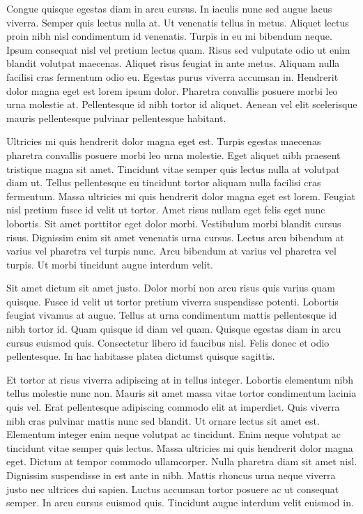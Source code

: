 \documentclass[11pt,a4paper]{article}
\begin{document}
Congue quisque egestas diam in arcu cursus. In iaculis nunc sed augue lacus viverra. Semper quis lectus nulla at. Ut venenatis tellus in metus. Aliquet lectus proin nibh nisl condimentum id venenatis. Turpis in eu mi bibendum neque. Ipsum consequat nisl vel pretium lectus quam. Risus sed vulputate odio ut enim blandit volutpat maecenas. Aliquet risus feugiat in ante metus. Aliquam nulla facilisi cras fermentum odio eu. Egestas purus viverra accumsan in. Hendrerit dolor magna eget est lorem ipsum dolor. Pharetra convallis posuere morbi leo urna molestie at. Pellentesque id nibh tortor id aliquet. Aenean vel elit scelerisque mauris pellentesque pulvinar pellentesque habitant.

Ultricies mi quis hendrerit dolor magna eget est. Turpis egestas maecenas pharetra convallis posuere morbi leo urna molestie. Eget aliquet nibh praesent tristique magna sit amet. Tincidunt vitae semper quis lectus nulla at volutpat diam ut. Tellus pellentesque eu tincidunt tortor aliquam nulla facilisi cras fermentum. Massa ultricies mi quis hendrerit dolor magna eget est lorem. Feugiat nisl pretium fusce id velit ut tortor. Amet risus nullam eget felis eget nunc lobortis. Sit amet porttitor eget dolor morbi. Vestibulum morbi blandit cursus risus. Dignissim enim sit amet venenatis urna cursus. Lectus arcu bibendum at varius vel pharetra vel turpis nunc. Arcu bibendum at varius vel pharetra vel turpis. Ut morbi tincidunt augue interdum velit.

Sit amet dictum sit amet justo. Dolor morbi non arcu risus quis varius quam quisque. Fusce id velit ut tortor pretium viverra suspendisse potenti. Lobortis feugiat vivamus at augue. Tellus at urna condimentum mattis pellentesque id nibh tortor id. Quam quisque id diam vel quam. Quisque egestas diam in arcu cursus euismod quis. Consectetur libero id faucibus nisl. Felis donec et odio pellentesque. In hac habitasse platea dictumst quisque sagittis.

Et tortor at risus viverra adipiscing at in tellus integer. Lobortis elementum nibh tellus molestie nunc non. Mauris sit amet massa vitae tortor condimentum lacinia quis vel. Erat pellentesque adipiscing commodo elit at imperdiet. Quis viverra nibh cras pulvinar mattis nunc sed blandit. Ut ornare lectus sit amet est. Elementum integer enim neque volutpat ac tincidunt. Enim neque volutpat ac tincidunt vitae semper quis lectus. Massa ultricies mi quis hendrerit dolor magna eget. Dictum at tempor commodo ullamcorper. Nulla pharetra diam sit amet nisl. Dignissim suspendisse in est ante in nibh. Mattis rhoncus urna neque viverra justo nec ultrices dui sapien. Luctus accumsan tortor posuere ac ut consequat semper. In arcu cursus euismod quis. Tincidunt augue interdum velit euismod in.
\end{document}
